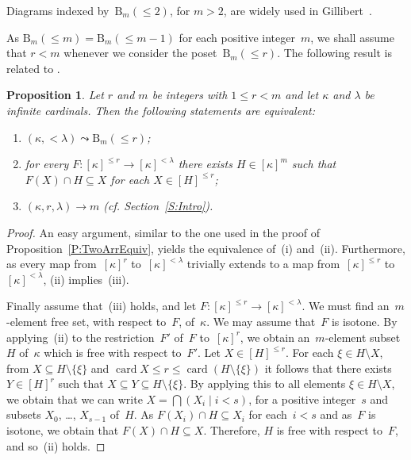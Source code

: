 \documentclass[psamsfonts,reqno]{amsart}
\theoremstyle{plain}
\newtheorem{proposition}[lemma]{Proposition}
\theoremstyle{definition}
\theoremstyle{remark}
\numberwithin{equation}{section}
\numberwithin{figure}{section}
\newcommand{\pup}[1]{\textup{(}{#1}\textup{)}}
\newcommand{\gk}{\kappa}
\newcommand{\gl}{\lambda}
\newcommand{\gx}{\xi}
\newcommand{\les}{\leqslant}
\DeclareMathOperator{\card}{card}
\newcommand{\famm}[2]{\left(#1\mid#2\right)}
\newcommand{\set}[1]{\{#1\}}
\newcommand{\rB}{\mathrm{B}}
\begin{document}
Diagrams indexed by~$\rB_m({\les}2)$, for $m>2$, are widely used in Gillibert~\cite{Gill2}.

As $\rB_m({\les}m)=\rB_m({\les}m-1)$ for each positive integer~$m$, we shall assume that $r<m$ whenever we consider the poset~$\rB_m({\les}r)$. The following result is related to \cite[Corollaire~3.3.3]{GillTh}.

\begin{proposition}\label{P:FreeB(k,m)}
Let $r$ and $m$ be integers with $1\leq r<m$ and let $\gk$ and $\gl$ be infinite cardinals. Then the following statements are equivalent:
\begin{enumerate}
\item $(\gk,{<}\gl)\leadsto\rB_m({\les}r)$;

\item for every $F\colon[\gk]^{{\les}r}\to[\gk]^{<\gl}$ there exists $H\in[\gk]^m$ such that $F(X)\cap H\subseteq X$ for each $X\in[H]^{{\les}r}$;

\item $(\gk,r,\gl)\to m$ \pup{cf. Section~\textup{\ref{S:Intro}}}.
\end{enumerate}
\end{proposition}

\begin{proof}
An easy argument, similar to the one used in the proof of Proposition~\ref{P:TwoArrEquiv}, yields the equivalence of~(i) and~(ii). Furthermore, as every map from~$[\gk]^r$ to~$[\gk]^{<\gl}$ trivially extends to a map from~$[\gk]^{{\les}r}$ to~$[\gk]^{<\gl}$, (ii) implies~(iii).

Finally assume that~(iii) holds, and let $F\colon[\gk]^{{\les}r}\to[\gk]^{<\gl}$. We must find an~$m$-element free set, with respect to~$F$, of~$\gk$. We may assume that~$F$ is isotone. By applying~(ii) to the restriction~$F'$ of~$F$ to~$[\gk]^r$, we obtain an~$m$-element subset~$H$ of~$\gk$ which is free with respect to~$F'$. Let $X\in[H]^{{\les}r}$. For each $\gx\in H\setminus X$, from $X\subseteq H\setminus\set{\gx}$ and $\card X\leq r\leq\card(H\setminus\set{\gx})$ it follows that there exists $Y\in[H]^r$ such that $X\subseteq Y\subseteq H\setminus\set{\gx}$. By applying this to all elements $\gx\in H\setminus X$, we obtain that we can write $X=\bigcap\famm{X_i}{i<s}$, for a positive integer~$s$ and subsets $X_0$, \dots, $X_{s-1}$ of~$H$. As $F(X_i)\cap H\subseteq X_i$ for each~$i<s$ and as~$F$ is isotone, we obtain that $F(X)\cap H\subseteq X$. Therefore, $H$ is free with respect to~$F$, and so~(ii) holds.
\end{proof}
\end{document}
